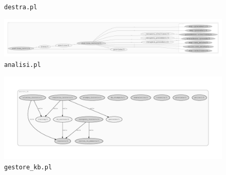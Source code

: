 \begin{figure}
	\caption{\texttt{destra.pl}}
\end{figure}

\begin{figure}
	\includegraphics[width=\textwidth, height=\textheight, keepaspectratio]{diagrams/analisi}
	\caption{\texttt{analisi.pl}}
\end{figure}

\begin{figure}
	\includegraphics[width=\textwidth, height=\textheight, keepaspectratio]{diagrams/gestore_kb}
	\caption{\texttt{gestore\_kb.pl}}
\end{figure}

